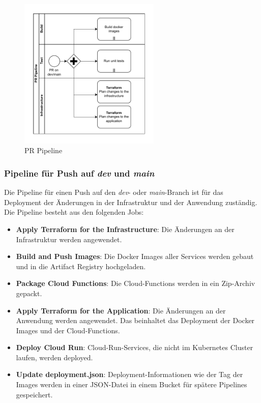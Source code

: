 \begin{figure}[H]
  \centering
  \includegraphics[width=0.6\textwidth]{resources/pr-pipeline.pdf}
  \caption{PR Pipeline}
  \label{fig:pr-pipeline}
\end{figure}


\subsubsection*{Pipeline für Push auf \textit{dev} und \textit{main}}

Die Pipeline für einen Push auf den \textit{dev}- oder \textit{main}-Branch ist für das 
Deployment der Änderungen in der Infrastruktur und der Anwendung zuständig.
Die Pipeline besteht aus den folgenden Jobs:

\begin{itemize}
  \item \textbf{Apply Terraform for the Infrastructure}: Die Änderungen an der Infrastruktur werden angewendet.
  \item \textbf{Build and Push Images}: Die Docker Images aller Services werden gebaut und in die Artifact Registry hochgeladen.
  \item \textbf{Package Cloud Functions}: Die Cloud-Functions werden in ein Zip-Archiv gepackt.
  \item \textbf{Apply Terraform for the Application}: Die Änderungen an der Anwendung werden angewendet. Das beinhaltet das Deployment der Docker Images und der Cloud-Functions.
  \item \textbf{Deploy Cloud Run}: Cloud-Run-Services, die nicht im Kubernetes Cluster laufen, werden deployed.
  \item \textbf{Update deployment.json}: Deployment-Informationen wie der Tag der Images werden in einer JSON-Datei in einem Bucket für spätere Pipelines gespeichert.
\end{itemize}

